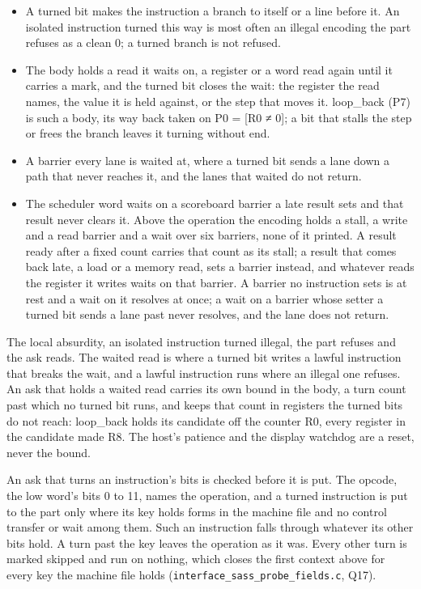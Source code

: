 \begin{itemize}
\item A turned bit makes the instruction a branch to itself or a line before it. An isolated instruction turned this way is most often an illegal encoding the part refuses as a clean 0; a turned branch is not refused.
\item The body holds a read it waits on, a register or a word read again until it carries a mark, and the turned bit closes the wait: the register the read names, the value it is held against, or the step that moves it. loop\_\allowbreak{}back (P7) is such a body, its way back taken on P0 = [R0 ≠ 0]; a bit that stalls the step or frees the branch leaves it turning without end.
\item A barrier every lane is waited at, where a turned bit sends a lane down a path that never reaches it, and the lanes that waited do not return.
\item The scheduler word waits on a scoreboard barrier a late result sets and that result never clears it. Above the operation the encoding holds a stall, a write and a read barrier and a wait over six barriers, none of it printed. A result ready after a fixed count carries that count as its stall; a result that comes back late, a load or a memory read, sets a barrier instead, and whatever reads the register it writes waits on that barrier. A barrier no instruction sets is at rest and a wait on it resolves at once; a wait on a barrier whose setter a turned bit sends a lane past never resolves, and the lane does not return.
\end{itemize}

The local absurdity, an isolated instruction turned illegal, the part refuses and the ask reads. The waited read is where a turned bit writes a lawful instruction that breaks the wait, and a lawful instruction runs where an illegal one refuses. An ask that holds a waited read carries its own bound in the body, a turn count past which no turned bit runs, and keeps that count in registers the turned bits do not reach: loop\_\allowbreak{}back holds its candidate off the counter R0, every register in the candidate made R8. The host's patience and the display watchdog are a reset, never the bound.

An ask that turns an instruction's bits is checked before it is put. The opcode, the low word's bits 0 to 11, names the operation, and a turned instruction is put to the part only where its key holds forms in the machine file and no control transfer or wait among them. Such an instruction falls through whatever its other bits hold. A turn past the key leaves the operation as it was. Every other turn is marked skipped and run on nothing, which closes the first context above for every key the machine file holds (\texttt{interface\_\allowbreak{}sass\_\allowbreak{}probe\_\allowbreak{}fields.\allowbreak{}c}, Q17).

